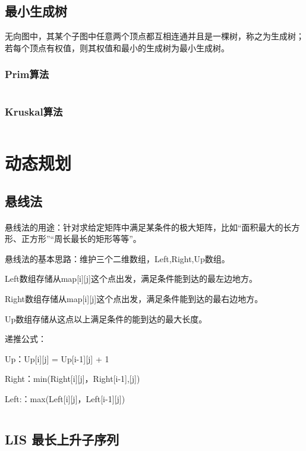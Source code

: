 \documentclass[a4paper,11pt]{article}
\begin{document}
\subsection{最小生成树} %
无向图中，其某个子图中任意两个顶点都互相连通并且是一棵树，称之为生成树；若每个顶点有权值，则其权值和最小的生成树为最小生成树。
\subsubsection{Prim算法}
\inputminted[breaklines,linenos,frame=leftline]{c++}{graph/prim.cpp}
\subsubsection{Kruskal算法} %
\inputminted[breaklines,linenos,frame=leftline]{c++}{graph/kruskal.cpp}




\newpage
\section{动态规划}
\subsection{悬线法}
\paragraph{}
悬线法的用途：针对求给定矩阵中满足某条件的极大矩阵，比如“面积最大的长方形、正方形”“周长最长的矩形等等”。

悬线法的基本思路：维护三个二维数组，Left,Right,Up数组。

Left数组存储从map[i][j]这个点出发，满足条件能到达的最左边地方。

Right数组存储从map[i][j]这个点出发，满足条件能到达的最右边地方。

Up数组存储从这点以上满足条件的能到达的最大长度。

递推公式：

Up：Up[i][j] = Up[i-1][j] + 1

Right：min(Right[i][j]，Right[i-1],[j])

Left:：max(Left[i][j]，Left[i-1][j])
\inputminted[breaklines,linenos,frame=leftline]{c++}{DP/StretchedWire.cpp}

\subsection{LIS 最长上升子序列}
\inputminted[breaklines,linenos,frame=leftline]{c++}{DP/lis.cpp}
\end{document}
